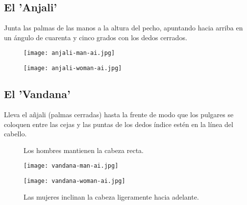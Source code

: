 \subsection{El 'Anjali'}

Junta las palmas de las manos a la altura del pecho, apuntando hacia arriba en un ángulo de cuarenta y cinco grados con los dedos cerrados.
\begin{figure}[h]
	\centering
	
	\begin{minipage}{0.49\textwidth}
		\centering
		\texttt{[image: anjali-man-ai.jpg]}
	\end{minipage}
	\hfill
	\begin{minipage}{0.49\textwidth}
		\centering
		\texttt{[image: anjali-woman-ai.jpg]}
	\end{minipage}
	
\end{figure}

\subsection{El 'Vandana'}

Lleva el añjali (palmas cerradas) hasta la frente de modo que los pulgares se coloquen entre las cejas y las puntas de los dedos índice estén en la línea del cabello.

\begin{figure}[h]
	\centering
	
	\begin{minipage}{0.49\textwidth}
		\centering
		\caption{Los hombres mantienen la cabeza recta.}
		\texttt{[image: vandana-man-ai.jpg]}
	\end{minipage}
	\hfill
	\begin{minipage}{0.49\textwidth}
		\centering
		\caption{Las mujeres inclinan la cabeza ligeramente hacia adelante.}
		\texttt{[image: vandana-woman-ai.jpg]}

	\end{minipage}
\end{figure}
\enlargethispage{3\baselineskip}
